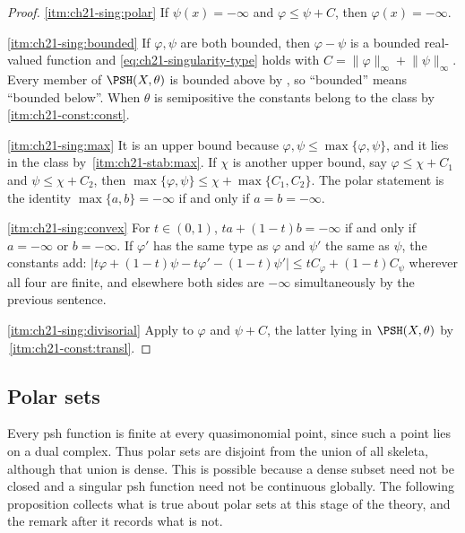 \begin{proof}
\cref{itm:ch21-sing:polar}  If \(\psi(x)=-\infty\) and
\(\varphi\leq\psi+C\), then \(\varphi(x)=-\infty\).

\cref{itm:ch21-sing:bounded}  If \(\varphi,\psi\) are both bounded, then
\(\varphi-\psi\) is a bounded real-valued function and
\eqref{eq:ch21-singularity-type} holds with \(C=\lVert\varphi\rVert_\infty
+\lVert\psi\rVert_\infty\).  Every member of \(\PSH(X,\theta)\) is bounded
above by , so ``bounded'' means ``bounded
below''.  When \(\theta\) is semipositive the constants belong to the class
by \,\cref{itm:ch21-const:const}.

\cref{itm:ch21-sing:max}  It is an upper bound because
\(\varphi,\psi\leq\max\{\varphi,\psi\}\), and it lies in the class by
\,\cref{itm:ch21-stab:max}.  If \(\chi\) is another
upper bound, say \(\varphi\leq\chi+C_1\) and \(\psi\leq\chi+C_2\), then
\(\max\{\varphi,\psi\}\leq\chi+\max\{C_1,C_2\}\).  The polar statement is
the identity \(\max\{a,b\}=-\infty\) if and only if \(a=b=-\infty\).

\cref{itm:ch21-sing:convex}  For \(t\in(0,1)\), \(t a+(1-t)b=-\infty\) if and
only if \(a=-\infty\) or \(b=-\infty\).  If \(\varphi'\) has the same type
as \(\varphi\) and \(\psi'\) the same as \(\psi\), the constants add:
\(|t\varphi+(1-t)\psi-t\varphi'-(1-t)\psi'|\leq tC_\varphi+(1-t)C_\psi\)
wherever all four are finite, and elsewhere both sides are \(-\infty\)
simultaneously by the previous sentence.

\cref{itm:ch21-sing:divisorial}  Apply
 to \(\varphi\) and \(\psi+C\), the latter
lying in \(\PSH(X,\theta)\) by
\,\cref{itm:ch21-const:transl}.
\end{proof}

\subsection{Polar sets}
\label{sec:ch21-polar}

Every psh function is finite at every quasimonomial point, since such a
point lies on a dual complex.  Thus polar sets are disjoint from the union
of all skeleta, although that union is dense.  This is possible because a
dense subset need not be closed and a singular psh function need not be
continuous globally.  The following proposition collects what is true about
polar sets at this stage of the theory, and the remark after it records what
is not.

